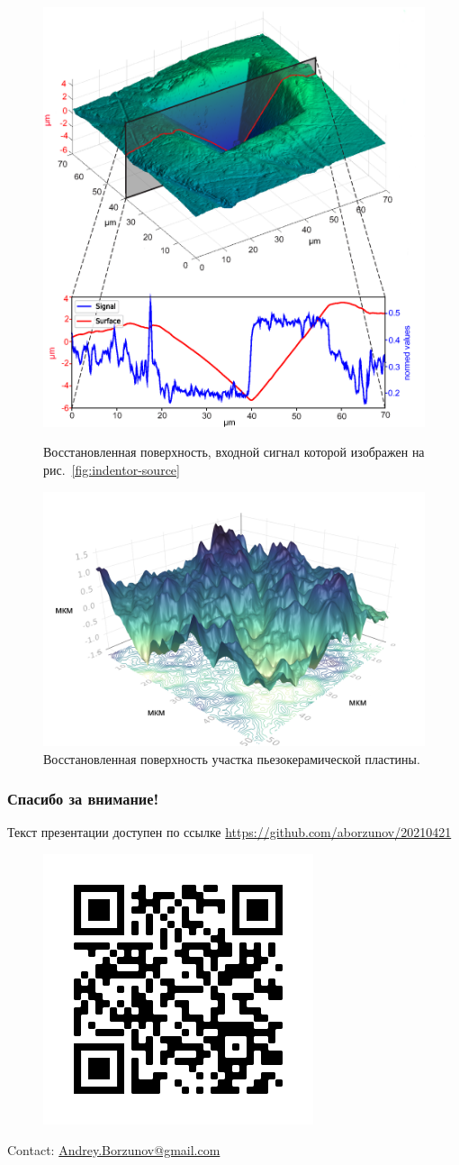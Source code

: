 \documentclass{beamer}
\begin{document}
\begin{frame}[c,allowframebreaks]
\framebreak

    \begin{figure}
        \includegraphics[width=0.45\linewidth]{indentor.eps}
        \caption{Восстановленная поверхность, входной сигнал которой изображен на
        рис.~\ref{fig:indentor-source}}
        {\label{fig:indentor}}%
    \end{figure}

\framebreak

    \begin{figure}[ht]
        \includegraphics[width=0.55\linewidth]{PZT.png}
        \caption{Восстановленная поверхность участка пьезокерамической пластины.}
    \end{figure}


\end{frame}

\begin{frame}[c,allowframebreaks]
    
\end{frame}

\begin{frame}[c]
    \frametitle{Спасибо за внимание!}
    Текст презентации доступен по ссылке
    \url{https://github.com/aborzunov/20210421}
    \begin{figure}
        \includegraphics[width=0.5\linewidth]{repo_link.png}
    \end{figure}
     Contact: \url{Andrey.Borzunov@gmail.com}
\end{frame}
\end{document}
